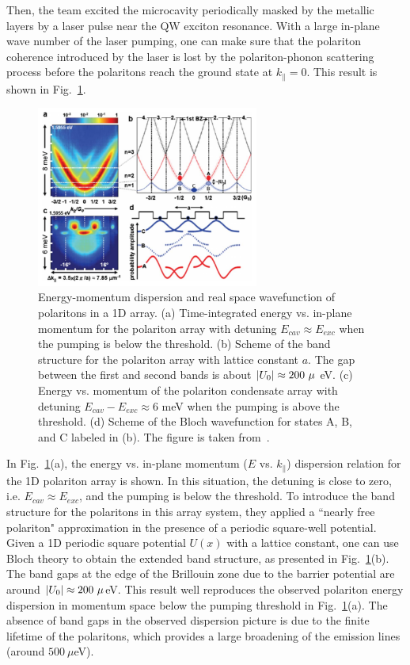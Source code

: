 Then, the team excited the microcavity periodically masked by the metallic layers by a laser pulse near the QW exciton resonance.
With a large in-plane wave number of the laser pumping, one can make sure that the polariton coherence introduced by the laser is lost by the polariton-phonon scattering process before the polaritons reach the ground state at $k_\parallel=0$. 
This result is shown in Fig.~\ref{fig:Ch1_bandstructure}.
%
\begin{figure}[ht]
    \centering
    \includegraphics[width=0.65\textwidth]{Fig/Ch1/periodic2.png}
    \caption[Polariton band structure]{Energy-momentum dispersion and real space wavefunction of polaritons in a 1D array. (a) Time-integrated energy vs. in-plane momentum for the polariton array with detuning $E_{cav}\approx E_{exc}$ when the pumping is below the threshold. (b) Scheme of the band structure for the polariton array with lattice constant $a$. The gap between the first and second bands is about $\abs{U_0}\approx 200~\mu$ eV. (c) Energy vs. momentum of the polariton condensate array with detuning $E_{cav}-E_{exc}\approx 6$ meV when the pumping is above the threshold. (d) Scheme of the Bloch wavefunction for states A, B, and C labeled in (b). The figure is taken from~\cite{Lai:2007aa}.}
    \label{fig:Ch1_bandstructure}
\end{figure}
%

In Fig.~\ref{fig:Ch1_bandstructure}(a), the energy vs. in-plane momentum ($E$ vs. $k_\parallel$) dispersion relation for the 1D polariton array is shown.
In this situation, the detuning is close to zero, i.e. $E_{cav}\approx E_{exc}$, and the pumping is below the threshold.
To introduce the band structure for the polaritons in this array system, they applied a ``nearly free polariton" approximation in the presence of a periodic square-well potential.
Given a 1D periodic square potential $U\left(x\right)$ with a lattice constant, one can use Bloch theory to obtain the extended band structure, as presented in Fig.~\ref{fig:Ch1_bandstructure}(b).
The band gaps at the edge of the Brillouin zone due to the barrier potential are around $\abs{U_0}\approx 200~\mu$eV.
This result well reproduces the observed polariton energy dispersion in momentum space below the pumping threshold in Fig.~\ref{fig:Ch1_bandstructure}(a).
The absence of band gaps in the observed dispersion picture is due to the finite lifetime of the polaritons, which provides a large broadening of the emission lines (around $500~\mu$eV).

